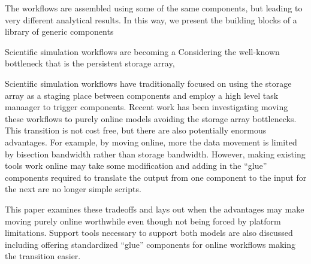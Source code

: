 The workflows are assembled using
some of the same components, but leading to very different analytical results.
In this way, we present the building blocks of a library of generic components


Scientific simulation workflows are becoming a 
Considering the well-known bottleneck that is the persistent storage array,


Scientific simulation workflows have traditionally focused on using the storage
array as a staging place between components and employ a high level task
manaager to trigger components. Recent work has been investigating moving these
workflows to purely online models avoiding the storage array bottlenecks. This
transition is not cost free, but there are also potentially enormous advantages.
For example, by moving online, more the data movement is limited by bisection
bandwidth rather than storage bandwidth. However, making existing tools work
online may take some modification and adding in the ``glue'' components required
to translate the output from one component to the input for the next are no
longer simple scripts.

This paper examines these tradeoffs and lays out when the advantages may make
moving purely online worthwhile even though not being forced by platform
limitations. Support tools necessary to support both models are also discussed
including offering standardized ``glue'' components for online workflows making
the transition easier.
\fi

